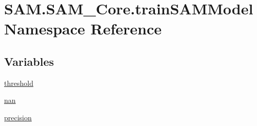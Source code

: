 \hypertarget{namespaceSAM_1_1SAM__Core_1_1trainSAMModel}{}\section{S\+A\+M.\+S\+A\+M\+\_\+\+Core.\+train\+S\+A\+M\+Model Namespace Reference}
\label{namespaceSAM_1_1SAM__Core_1_1trainSAMModel}
\subsection*{Variables}
\begin{DoxyCompactItemize}
\item 
\hyperlink{namespaceSAM_1_1SAM__Core_1_1trainSAMModel_a75a8353e5b55e744062b1b0b85bfa209}{threshold}
\item 
\hyperlink{namespaceSAM_1_1SAM__Core_1_1trainSAMModel_ada829c3b8c4a9aa3c556a90ad84ed7b2}{nan}
\item 
\hyperlink{namespaceSAM_1_1SAM__Core_1_1trainSAMModel_a0d813ce557a3e734bb4d3cdc1d1c5519}{precision}
\end{DoxyCompactItemize}
